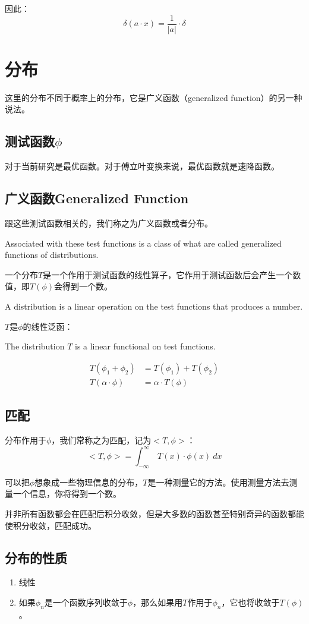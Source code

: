 因此：
\begin{equation}
	\delta(a\cdot x)=\frac{1}{|a|}\cdot \delta
\end{equation}
\section{分布}
这里的分布不同于概率上的分布，它是广义函数（generalized function）的另一种说法。
\subsection{测试函数$\phi$}
对于当前研究是最优函数。对于傅立叶变换来说，最优函数就是速降函数。
\subsection{广义函数Generalized Function}
跟这些测试函数相关的，我们称之为广义函数或者分布。

Associated with these test functions is a class of what are called generalized functions of distributions.

一个分布$T$是一个作用于测试函数的线性算子，它作用于测试函数后会产生一个数值，即$T(\phi)$会得到一个数。

A distribution is a linear operation on the test functions that produces a number.

$T$是$\phi$的线性泛函：

The distribution $T$ is a linear functional on test functions.

\begin{align*}
	T(\phi_1+\phi_2)    & =T(\phi_1)+T(\phi_2) \\
	T(\alpha\cdot \phi) & =\alpha\cdot T(\phi)
\end{align*}
\subsection{匹配}
分布作用于$\phi$，我们常称之为匹配，记为$<T,\phi>$：
\begin{equation}
	<T,\phi> = \int_{-\infty}^{\infty}\ T(x)\cdot \phi(x)\ dx
\end{equation}

可以把$\phi$想象成一些物理信息的分布，$T$是一种测量它的方法。使用测量方法去测量一个信息，你将得到一个数。

并非所有函数都会在匹配后积分收敛，但是大多数的函数甚至特别奇异的函数都能使积分收敛，匹配成功。

\subsection{分布的性质}
\begin{enumerate}
	\item 线性
	\item 如果$\phi_n$是一个函数序列收敛于$\phi$，那么如果用$T$作用于$\phi_n$，它也将收敛于$T(\phi)$。
\end{enumerate}



